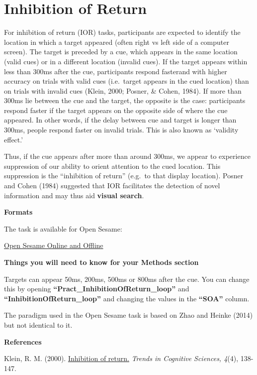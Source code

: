\documentclass[
]{book}
\begin{document}
\hypertarget{inhibition-of-return}{%
\section{Inhibition of Return}\label{inhibition-of-return}}

For inhibition of return (IOR) tasks, participants are expected to identify the location in which a target appeared (often right vs left side of a computer screen). The target is preceded by a cue, which appears in the same location (valid cues) or in a different location (invalid cues). If the target appears within less than 300ms after the cue, participants respond fasterand with higher accuracy on trials with valid cues (i.e.~target appears in the cued location) than on trials with invalid cues (Klein, 2000; Posner, \& Cohen, 1984). If more than 300ms lie between the cue and the target, the opposite is the case: participants respond faster if the target appears on the opposite side of where the cue appeared. In other words, if the delay between cue and target is longer than 300ms, people respond faster on invalid trials. This is also known as `validity effect.'

Thus, if the cue appears after more than around 300ms, we appear to experience suppression of our ability to orient attention to the cued location. This suppression is the ``inhibition of return'' (e.g.~to that display location). Posner and Cohen (1984) suggested that IOR facilitates the detection of novel information and may thus aid \textbf{visual search}.

\textbf{Formats}

The task is available for Open Sesame:

\href{link\%20here}{Open Sesame Online and Offline}

\textbf{Things you will need to know for your Methods section}

Targets can appear 50ms, 200ms, 500ms or 800ms after the cue. You can change this by opening \textbf{``Pract\_InhibitionOfReturn\_loop''} and \textbf{``InhibitionOfReturn\_loop''} and changing the values in the \textbf{``SOA''} column.

The paradigm used in the Open Sesame task is based on Zhao and Heinke (2014) but not identical to it.

\textbf{References}

Klein, R. M. (2000). \href{https://www.researchgate.net/profile/Juan_Lupianez/publication/233995999_Inhibition_of_Return/links/0c960525d778745c66000000/Inhibition-of-Return.pdf}{Inhibition of return.} \emph{Trends in Cognitive Sciences, 4}(4), 138-147.
\end{document}
